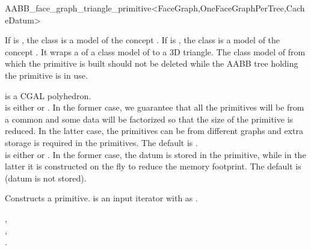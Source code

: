 \ccRefPageBegin

\begin{ccRefClass}{AABB_face_graph_triangle_primitive<FaceGraph,OneFaceGraphPerTree,CacheDatum>}

\ccDefinition
  
If  is , the class is a model of the concept .
If  is , the class  is a model of the concept .
It wraps a  of a class model of  to a 3D triangle.
The class model of  from which the primitive is built should not be deleted
while the AABB tree holding the primitive is in use.



\ccParameters
{} is a CGAL polyhedron.\\
 is either  or . In the former case, we guarantee that all the primitives will be from a common  and some data 
will be factorized so that the size of the primitive is reduced. In the latter case, the primitives can be from different graphs and extra storage is required in the primitives. The default is .\\
 is either  or . In the former case, the datum is stored in the primitive, while in the latter it is constructed on the fly to reduce
the memory footprint. The default is  (datum is not stored).\\


\ccTypes
{}
\ccGlue
{}
\ccGlue
{}

\ccCreation
{}

{Constructs a primitive.  is an input iterator with  as .}


\ccSeeAlso

,\\
,\\
.\\

\end{ccRefClass}

\ccRefPageEnd
